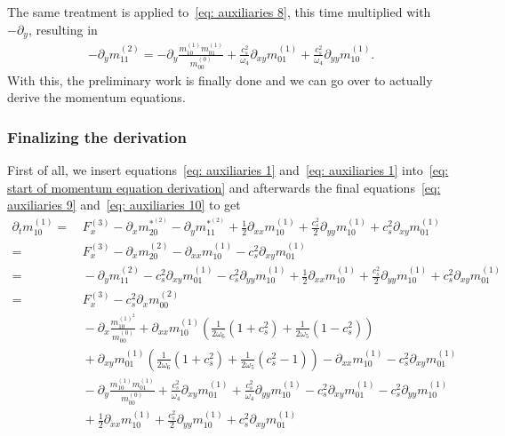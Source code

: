 The same treatment is applied to~\eqref{eq: auxiliaries 8}, this time multiplied with $-\partial_y$, resulting in
\begin{align}
  \label{eq: auxiliaries 10}
  -\partial_y m_{11}^{(2)}
  =
  -\partial_y \frac{ m_{10}^{(1)}m_{01}^{(1)}}{m_{00}^{(0)}}
  + \frac{c_s^2}{\omega_4}\partial_{xy} m_{01}^{(1)}
  + \frac{c_s^2}{\omega_4}\partial_{yy} m_{10}^{(1)}
  .
\end{align}
With this, the preliminary work is finally done and we can go over to actually derive the momentum equations.

\subsubsection{Finalizing the derivation}
\label{subs:Finalizing the derivation}
First of all, we insert equations~\eqref{eq: auxiliaries 1} and~\eqref{eq: auxiliaries 1} into~\eqref{eq: start of momentum equation derivation}
and afterwards the final equations~\eqref{eq: auxiliaries 9} and~\eqref{eq: auxiliaries 10} to get
\begin{align}
  \nonumber
  \partial_t m_{10}^{(1)} =&\,
  F_x^{(3)}
  - \partial_x m_{20}^{*^{(2)}}
  - \partial_y m_{11}^{*^{(2)}}
  + \frac{1}{2}\partial_{xx} m_{10}^{(1)}
  + \frac{c_s^2}{2} \partial_{yy} m_{10}^{(1)} + c_s^2\partial_{xy} m_{01}^{(1)}
  \\\nonumber =&\,
  F_x^{(3)}
  - \partial_x m_{20}^{(2)}
  - \partial_{xx} m_{10}^{(1)}
  - c_s^2\partial_{xy} m_{01}^{(1)}
  \\\nonumber =&\,
  - \partial_y m_{11}^{(2)}
  - c_s^2 \partial_{xy} m_{01}^{(1)}
  - c_s^2 \partial_{yy} m_{10}^{(1)}
  + \frac{1}{2}\partial_{xx} m_{10}^{(1)}
  + \frac{c_s^2}{2} \partial_{yy} m_{10}^{(1)} + c_s^2\partial_{xy} m_{01}^{(1)}
  \\\nonumber =&\,
  F_x^{(3)}
  - c_s^2 \partial_x  m_{00}^{(2)}
  \\\nonumber &\,
  - \partial_x\frac{ m_{10}^{{(1)}^2} }{m_{00}^{(0)}}
  + \partial_{xx} m_{10}^{(1)} \left(\frac{1}{2\omega_6}(1+c_s^2)
  + \frac{1}{2\omega_5} (1 - c_s^2)\right)
  \\\nonumber &\,
  + \partial_{xy} m_{01}^{(1)} \left(\frac{1}{2\omega_6}(1+c_s^2)
  + \frac{1}{2\omega_5} (c_s^2 - 1)\right)
  - \partial_{xx} m_{10}^{(1)}
  - c_s^2\partial_{xy} m_{01}^{(1)}
  \\\nonumber &\,
  -\partial_y \frac{ m_{10}^{(1)}m_{01}^{(1)}}{m_{00}^{(0)}}
  + \frac{c_s^2}{\omega_4}\partial_{xy} m_{01}^{(1)}
  + \frac{c_s^2}{\omega_4}\partial_{yy} m_{10}^{(1)}
  - c_s^2 \partial_{xy} m_{01}^{(1)}
  - c_s^2 \partial_{yy} m_{10}^{(1)}
  \\\nonumber &\,
  + \frac{1}{2}\partial_{xx} m_{10}^{(1)}
  + \frac{c_s^2}{2} \partial_{yy} m_{10}^{(1)} + c_s^2\partial_{xy} m_{01}^{(1)}
  \end{align}
